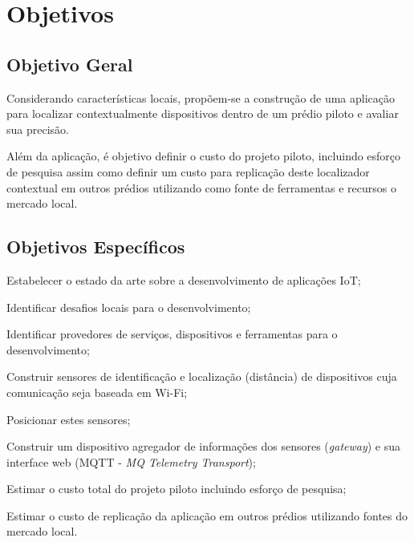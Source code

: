 
\section{Objetivos}
\label{sec:Objetivos}

\subsection{Objetivo Geral}
\label{subsec:Objetivo Geral}

Considerando características locais, propõem-se a construção de uma aplicação
para localizar contextualmente dispositivos dentro de um prédio piloto e avaliar
sua precisão.

Além da aplicação, é objetivo definir o custo do projeto piloto, incluindo
esforço de pesquisa assim como definir um custo para replicação deste
localizador contextual em outros prédios utilizando como fonte de ferramentas e
recursos o mercado local.

\subsection{Objetivos Específicos}
\label{subsec:Objetivos Específicos}

\begin{alineas}

	\item Estabelecer o estado da arte sobre a desenvolvimento de aplicações IoT;

	\item Identificar desafios locais para o desenvolvimento;

	\item Identificar provedores de serviços, dispositivos e ferramentas para o
desenvolvimento;

	\item Construir sensores de identificação e localização (distância) de
 dispositivos cuja comunicação seja baseada em Wi-Fi;

	\item Posicionar estes sensores;

	\item Construir um dispositivo agregador de informações dos sensores
 (\emph{gateway}) e sua interface web (MQTT - \emph{MQ Telemetry Transport});

	\item Estimar o custo total do projeto piloto incluindo esforço de pesquisa;

	\item Estimar o custo de replicação da aplicação em outros prédios
	utilizando fontes do mercado local.

\end{alineas}
